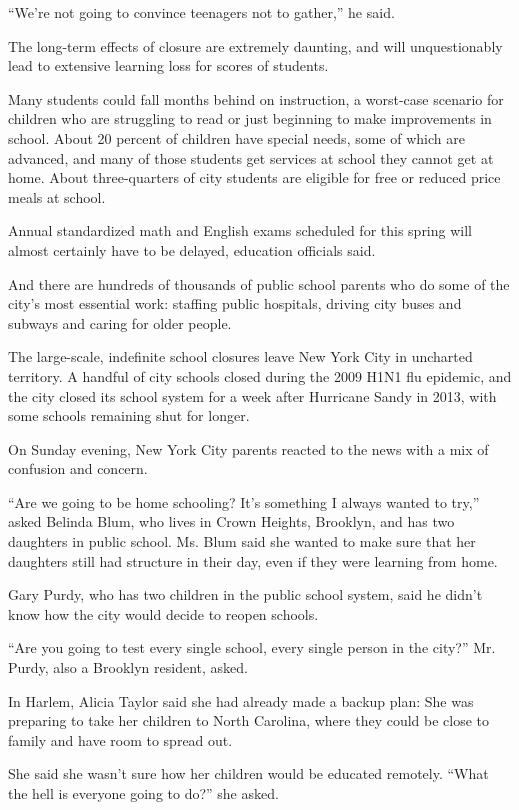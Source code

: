 ``We're not going to convince teenagers not to gather,'' he said.

The long-term effects of closure are extremely daunting, and will
unquestionably lead to extensive learning loss for scores of students.

Many students could fall months behind on instruction, a worst-case
scenario for children who are struggling to read or just beginning to
make improvements in school. About 20 percent of children have special
needs, some of which are advanced, and many of those students get
services at school they cannot get at home. About three-quarters of city
students are eligible for free or reduced price meals at school.

Annual standardized math and English exams scheduled for this spring
will almost certainly have to be delayed, education officials said.

And there are hundreds of thousands of public school parents who do some
of the city's most essential work: staffing public hospitals, driving
city buses and subways and caring for older people.

The large-scale, indefinite school closures leave New York City in
uncharted territory. A handful of city schools closed during the 2009
H1N1 flu epidemic, and the city closed its school system for a week
after Hurricane Sandy in 2013, with some schools remaining shut for
longer.

On Sunday evening, New York City parents reacted to the news with a mix
of confusion and concern.

``Are we going to be home schooling? It's something I always wanted to
try,'' asked Belinda Blum, who lives in Crown Heights, Brooklyn, and has
two daughters in public school. Ms. Blum said she wanted to make sure
that her daughters still had structure in their day, even if they were
learning from home.

Gary Purdy, who has two children in the public school system, said he
didn't know how the city would decide to reopen schools.

``Are you going to test every single school, every single person in the
city?'' Mr. Purdy, also a Brooklyn resident, asked.

In Harlem, Alicia Taylor said she had already made a backup plan: She
was preparing to take her children to North Carolina, where they could
be close to family and have room to spread out.

She said she wasn't sure how her children would be educated remotely.
``What the hell is everyone going to do?'' she asked.

